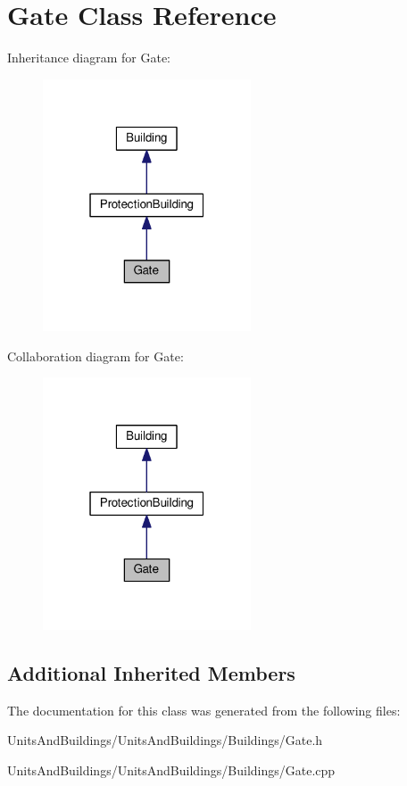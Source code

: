 \hypertarget{class_gate}{}\section{Gate Class Reference}
\label{class_gate}


Inheritance diagram for Gate\+:
\nopagebreak
\begin{figure}[H]
\begin{center}
\leavevmode
\includegraphics[width=175pt]{class_gate__inherit__graph}
\end{center}
\end{figure}


Collaboration diagram for Gate\+:
\nopagebreak
\begin{figure}[H]
\begin{center}
\leavevmode
\includegraphics[width=175pt]{class_gate__coll__graph}
\end{center}
\end{figure}
\subsection*{Additional Inherited Members}


The documentation for this class was generated from the following files\+:\begin{DoxyCompactItemize}
\item 
Units\+And\+Buildings/\+Units\+And\+Buildings/\+Buildings/Gate.\+h\item 
Units\+And\+Buildings/\+Units\+And\+Buildings/\+Buildings/Gate.\+cpp\end{DoxyCompactItemize}

